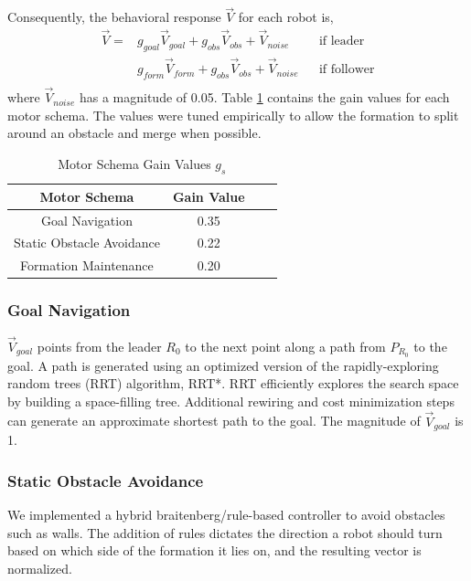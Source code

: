 \documentclass[letterpaper, 10 pt, conference]{ieeeconf}  %
\begin{document}
Consequently, the behavioral response $\vec{V}$ for each robot is,
\begin{equation*}
\begin{aligned}
\vec{V} = & g_{goal} \vec{V}_{goal} + g_{obs} \vec{V}_{obs} + \vec{V}_{noise}    && \text{if leader} \\
              & g_{form} \vec{V}_{form} + g_{obs} \vec{V}_{obs} + \vec{V}_{noise}   && \text{if follower} \\
\end{aligned}
\end{equation*}
where $\vec{V}_{noise}$ has a magnitude of 0.05. Table \ref{motor_schema_gs} contains the gain values for each motor schema. The values were tuned empirically to allow the formation to split around an obstacle and merge when possible.

\begin{table}[h]
\begin{center}
\begin{tabular}{|c|c|c c|}
\hline
Motor Schema & Gain Value \\
\hline
Goal Navigation                  & 0.35 \\
Static Obstacle Avoidance    & 0.22 \\
Formation Maintenance       & 0.20 \\
\hline
\end{tabular}
\end{center}
\caption{Motor Schema Gain Values $g_s$}
\label{motor_schema_gs}
\end{table}

\subsubsection*{Goal Navigation}

$\vec{V}_{goal}$ points from the leader $R_0$ to the next point along a path from $P_{R_0}$ to the goal. A path is generated using an optimized version of the rapidly-exploring random trees (RRT) algorithm, RRT*. RRT efficiently explores the search space by building a space-filling tree. Additional rewiring and cost minimization steps can generate an approximate shortest path to the goal. The magnitude of $\vec{V}_{goal}$ is 1.

\subsubsection*{Static Obstacle Avoidance}

We implemented a hybrid braitenberg/rule-based controller to avoid obstacles such as walls. The addition of rules dictates the direction a robot should turn based on which side of the formation it lies on, and the resulting vector is normalized.
\end{document}
